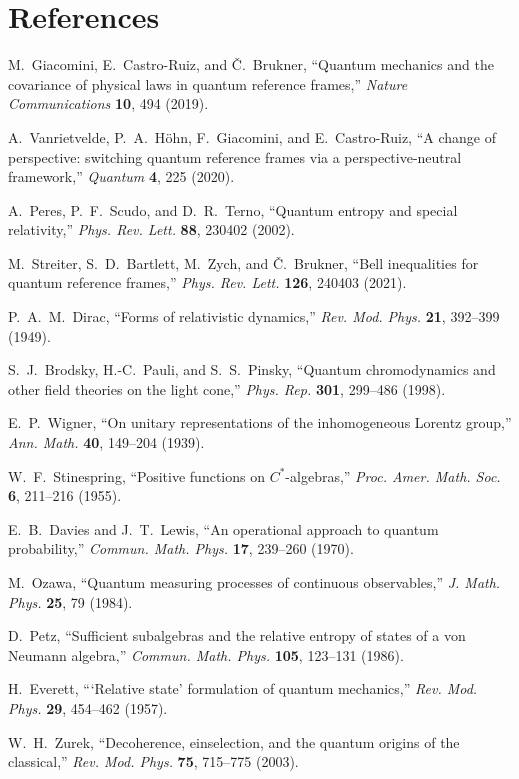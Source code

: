 \documentclass[aps,11pt]{article}
\begin{document}
\section{References}
\begin{thebibliography}{99}

M.~Giacomini, E.~Castro-Ruiz, and {\v C}.~Brukner,
``Quantum mechanics and the covariance of physical laws in quantum reference frames,''
\textit{Nature Communications} \textbf{10}, 494 (2019).

A.~Vanrietvelde, P.~A.~H{\"o}hn, F.~Giacomini, and E.~Castro-Ruiz,
``A change of perspective: switching quantum reference frames via a perspective-neutral framework,''
\textit{Quantum} \textbf{4}, 225 (2020).

A.~Peres, P.~F.~Scudo, and D.~R.~Terno,
``Quantum entropy and special relativity,''
\textit{Phys. Rev. Lett.} \textbf{88}, 230402 (2002).

M.~Streiter, S.~D.~Bartlett, M.~Zych, and {\v C}.~Brukner,
``Bell inequalities for quantum reference frames,''
\textit{Phys. Rev. Lett.} \textbf{126}, 240403 (2021).

P.~A.~M.~Dirac,
``Forms of relativistic dynamics,''
\textit{Rev. Mod. Phys.} \textbf{21}, 392--399 (1949).

S.~J.~Brodsky, H.-C.~Pauli, and S.~S.~Pinsky,
``Quantum chromodynamics and other field theories on the light cone,''
\textit{Phys. Rep.} \textbf{301}, 299--486 (1998).

E.~P.~Wigner,
``On unitary representations of the inhomogeneous Lorentz group,''
\textit{Ann. Math.} \textbf{40}, 149--204 (1939).

W.~F.~Stinespring,
``Positive functions on $C^\ast$-algebras,''
\textit{Proc. Amer. Math. Soc.} \textbf{6}, 211--216 (1955).

E.~B.~Davies and J.~T.~Lewis,
``An operational approach to quantum probability,''
\textit{Commun. Math. Phys.} \textbf{17}, 239--260 (1970).

M.~Ozawa,
``Quantum measuring processes of continuous observables,''
\textit{J. Math. Phys.} \textbf{25}, 79 (1984).

D.~Petz,
``Sufficient subalgebras and the relative entropy of states of a von Neumann algebra,''
\textit{Commun. Math. Phys.} \textbf{105}, 123--131 (1986).

H.~Everett,
```Relative state' formulation of quantum mechanics,''
\textit{Rev. Mod. Phys.} \textbf{29}, 454--462 (1957).

W.~H.~Zurek,
``Decoherence, einselection, and the quantum origins of the classical,''
\textit{Rev. Mod. Phys.} \textbf{75}, 715--775 (2003).

\end{thebibliography}
\end{document}
